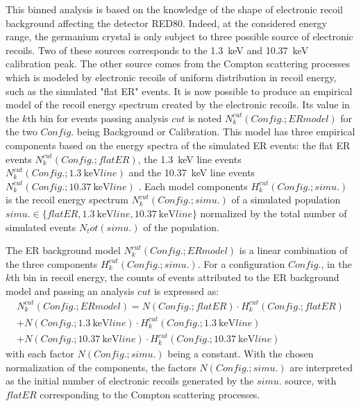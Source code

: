 This binned analysis is based on the knowledge of the shape of electronic recoil background affecting the detector RED80. Indeed, at the considered energy range, the germanium crystal is only subject to three possible source of electronic recoils. Two of these sources corresponds to the \SI{1.3}{\kilo\eV} and \SI{10.37}{\kilo\eV} calibration peak. The other source comes from the Compton scattering processes which is modeled by electronic recoils of uniform distribution in recoil energy, such as the simulated "flat ER" events. It is now possible to produce an empirical model of the recoil energy spectrum created by the electronic recoils. Its value in the $k$th bin for events passing analysis $cut$ is noted $N_k^{cut}(Config.; ER model)$ for the two $Config.$ being Background or Calibration. This model has three empirical components based on the energy spectra of the simulated ER events: the flat ER events $N_k^{cut}(Config.; flat ER)$, the \SI{1.3}{\kilo\eV} line events $N_k^{cut}(Config.; \SI{1.3}{\kilo\eV} line)$ and the \SI{10.37}{\kilo\eV} line events $N_k^{cut}(Config.; \SI{10.37}{\kilo\eV} line)$ . Each model components $H_k^{cut}(Config.; simu.)$ is the recoil energy spectrum $N_k^{cut}(Config.; simu.)$ of a simulated population $simu. \in \{flat ER, \SI{1.3}{\kilo\eV} line, \SI{10.37}{\kilo\eV} line \}$ normalized by the total number of simulated events $N_tot(simu.)$ of the population. 

The ER background model $N_k^{cut}(Config.; ER model)$  is a linear combination of the three components $H_k^{cut}(Config.; simu.)$. For a configuration $Config.$, in the $k$th bin in recoil energy, the counts of events attributed to the ER background model and passing an analysis $cut$  is expressed as:
\begin{multline}
N_k^{cut}(Config.; ER model)
=
N(Config.; flat ER) \cdot H_k^{cut}(Config.; flat ER) \\
+ N(Config.; \SI{1.3}{\kilo\eV} line) \cdot H_k^{cut}(Config.; \SI{1.3}{\kilo\eV} line) \\
+ N(Config.; \SI{10.37}{\kilo\eV} line) \cdot H_k^{cut}(Config.; \SI{10.37}{\kilo\eV} line)
\end{multline}
with each factor $N(Config.; simu.)$ being a constant. With the chosen normalization of the components, the factors $N(Config.; simu.)$ are interpreted as the initial number of electronic recoils generated by the $simu.$ source, with $flatER$ corresponding to the Compton scattering processes.


